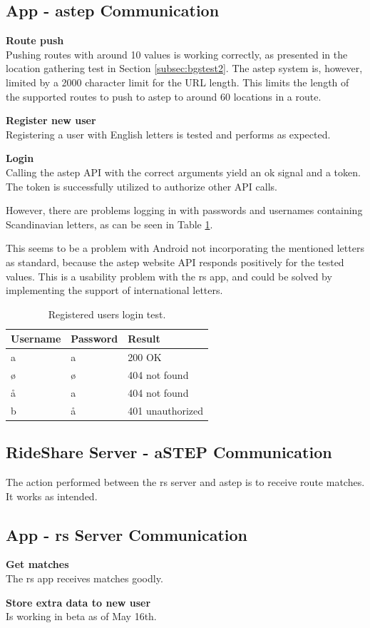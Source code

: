 \subsection{App - \gls{astep} Communication}
\textbf{Route push}\\
Pushing routes with around 10 values is working correctly, as presented in the location gathering test in Section \ref{subsec:bgstest2}.
The \gls{astep} system is, however, limited by a 2000 character limit for the URL length.
This limits the length of the supported routes to push to \gls{astep} to around 60 locations in a route.

\textbf{Register new user}\\
Registering a user with English letters is tested and performs as expected.

\textbf{Login}\\
Calling the \gls{astep} API with the correct arguments yield an ok signal and a token.
The token is successfully utilized to authorize other API calls.

However, there are problems logging in with passwords and usernames containing Scandinavian letters, as can be seen in Table \ref{tab:logintest}.

This seems to be a problem with Android not incorporating the mentioned letters as standard, because the \gls{astep} website API responds positively for the tested values.
This is a usability problem with the \gls{rs} app, and could be solved by implementing the support of international letters.

\begin{table}[!ht]
	\centering
	\begin{tabular}{@{}lll@{}}
		Username & Password & Result \\
		\hline
		a & a & 200 OK\\
		ø & ø & 404 not found\\
		å & a & 404 not found\\
		b & å & 401 unauthorized\\
	\end{tabular}
	\caption{Registered users login test.}
	\label{tab:logintest}
\end{table}


\subsection{RideShare Server - aSTEP Communication}
The action performed between the \gls{rs} server and \gls{astep} is to receive route matches.
It works as intended.


\subsection{App - \gls{rs} Server Communication}
\textbf{Get matches}\\
The \gls{rs} app receives matches goodly.

\textbf{Store extra data to new user}\\
Is working in beta as of May 16th.
\fi
